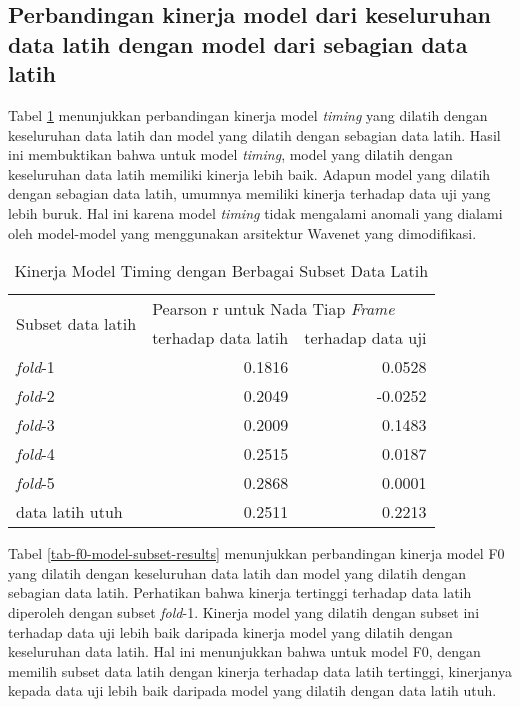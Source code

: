 \subsection{Perbandingan kinerja model dari keseluruhan data latih dengan model dari sebagian data latih}

Tabel \ref{tab-timing-model-subset-results} menunjukkan perbandingan kinerja model \textit{timing} yang dilatih dengan keseluruhan data latih dan model yang dilatih dengan sebagian data latih. Hasil ini membuktikan bahwa untuk model \textit{timing}, model yang dilatih dengan keseluruhan data latih memiliki kinerja lebih baik. Adapun model yang dilatih dengan sebagian data latih, umumnya memiliki kinerja terhadap data uji yang lebih buruk. Hal ini karena model \textit{timing} tidak mengalami anomali yang dialami oleh model-model yang menggunakan arsitektur Wavenet yang dimodifikasi.

\begin{table}[htbp]
    \centering
    \caption{Kinerja Model Timing dengan Berbagai Subset Data Latih}\label{tab-timing-model-subset-results}
    \begin{tabular}{ |l|r|r| } 
     \hline
     \multirow{2}{*}{Subset data latih} & \multicolumn{2}{l|}{Pearson r untuk Nada Tiap \textit{Frame}} \\
     \cline{2-3}
     & terhadap data latih & terhadap data uji \\\hline

	\textit{fold}-1          &0.1816  &0.0528\\\hline
	\textit{fold}-2          &0.2049 &-0.0252\\\hline
	\textit{fold}-3          &0.2009  &0.1483\\\hline
	\textit{fold}-4          &0.2515  &0.0187\\\hline
	\textit{fold}-5          &0.2868  &0.0001\\\hline
	data latih utuh			 &0.2511  &0.2213\\\hline
    \end{tabular}
\end{table}

Tabel \ref{tab-f0-model-subset-results} menunjukkan perbandingan kinerja model F0 yang dilatih dengan keseluruhan data latih dan model yang dilatih dengan sebagian data latih. Perhatikan bahwa kinerja tertinggi terhadap data latih diperoleh dengan subset \textit{fold}-1. Kinerja model yang dilatih dengan subset ini terhadap data uji lebih baik daripada kinerja model yang dilatih dengan keseluruhan data latih. Hal ini menunjukkan bahwa untuk model F0, dengan memilih subset data latih dengan kinerja terhadap data latih tertinggi, kinerjanya kepada data uji lebih baik daripada model yang dilatih dengan data latih utuh. 

